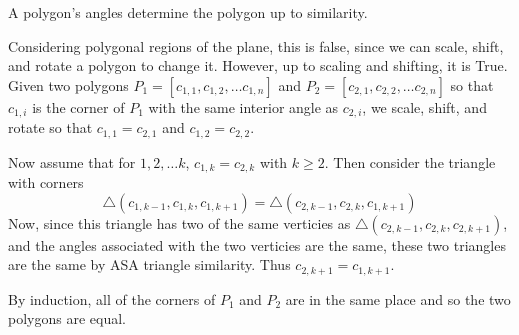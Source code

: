 \documentclass{homework}
\begin{document}
                                                                                                                        \begin{problem}
                                                                                                                          A polygon's angles determine the polygon up to similarity.
                                                                                                                          \end{problem}
                                                                                                                          \begin{solution}
                                                                                                                          Considering polygonal regions of the plane, this is false, since we can scale, shift, and rotate a polygon to change it. However, up to scaling and shifting, it is True. Given two polygons $P_1=[c_{1,1}, c_{1,2},\dots c_{1,n}]$ and $P_2 = [c_{2,1}, c_{2,2},\dots c_{2,n}]$ so that $c_{1,i}$ is the corner of $P_1$ with the same interior angle as $c_{2,i}$, we scale, shift, and rotate so that $c_{1,1}=c_{2,1}$ and $c_{1,2}=c_{2,2}$.

                                                                                                                          Now assume that for $1, 2, \dots k$, $c_{1,k}=c_{2,k}$ with $k\geq 2.$ Then consider the triangle with corners 
                                                                                                                          \[
                                                                                                                          \triangle(c_{1,k-1}, c_{1,k}, c_{1, k+1}) =
                                                                                                                          \triangle(c_{2,k-1}, c_{2,k}, c_{1, k+1})
                                                                                                                          \]
                                                                                                                          Now, since this triangle has two of the same verticies as $\triangle(c_{2,k-1}, c_{2,k}, c_{2, k+1})$, and the angles associated with the two verticies are the same, these two triangles are the same by ASA triangle similarity. Thus $c_{2, k+1} = c_{1, k+1}.$

                                                                                                                          By induction, all of the corners of $P_1$ and $P_2$ are in the same place and so the two polygons are equal.

                                                                                                                          \end{solution}
\end{document}
